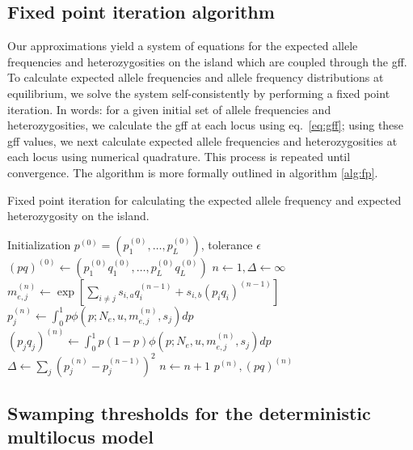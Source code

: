 \documentclass[
  11pt,
]{article}
\begin{document}
\hypertarget{sec:fp}{%
\subsection{Fixed point iteration algorithm}\label{sec:fp}}

Our approximations yield a system of equations for the expected allele
frequencies and heterozygosities on the island which are coupled through
the gff. To calculate expected allele frequencies and allele frequency
distributions at equilibrium, we solve the system self-consistently by
performing a fixed point iteration. In words: for a given initial set of
allele frequencies and heterozygosities, we calculate the gff at each
locus using eq.~\ref{eq:gff}; using these gff values, we next calculate
expected allele frequencies and heterozygosities at each locus using
numerical quadrature. This process is repeated until convergence. The
algorithm is more formally outlined in algorithm \autoref{alg:fp}.

\begin{algorithm}[t]                                                                                      
\caption{Fixed point iteration for calculating the expected allele frequency
and expected heterozygosity on the island.}\label{alg:fp}
\begin{algorithmic}[1]
\Require Initialization $p^{(0)} = (p_1^{(0)}, \dots, p_L^{(0)})$, tolerance $\epsilon$
\State $(pq)^{(0)} \leftarrow (p_1^{(0)}q_1^{(0)}, \dots, p_L^{(0)}q_L^{(0)})$
\State $n \leftarrow 1, \Delta \leftarrow \infty$
\While {$\Delta > \epsilon$}
\State $m_{e,j}^{(n)} \leftarrow \exp\left[ \sum_{i\ne j} s_{i,a} q_i^{(n-1)} +
    s_{i,b} (p_iq_i)^{(n-1)} \right]$
\State $p_j^{(n)} \leftarrow \int_0^1 p \phi(p; N_e, u, m_{e,j}^{(n)},s_j) dp$
\State $(p_jq_j)^{(n)} \leftarrow \int_0^1 p(1-p) \phi(p; N_e, u,
    m_{e,j}^{(n)},s_j) dp$
\EndFor
\State $\Delta \leftarrow \sum_j (p_j^{(n)} - p_j^{(n-1)})^2$
\State $n \leftarrow n+1$
\EndWhile
\State \Return $p^{(n)}, (pq)^{(n)}$
\end{algorithmic}
\end{algorithm}

\hypertarget{sec:supdet}{%
\subsection{Swamping thresholds for the deterministic multilocus
model}\label{sec:supdet}}
\end{document}
